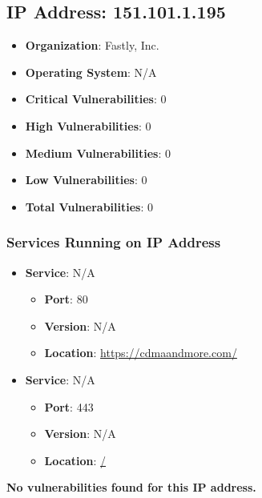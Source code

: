 \documentclass{article}
\begin{document}
\clearpage



\subsection{IP Address: 151.101.1.195}

\begin{itemize}
    \item \textbf{Organization}: Fastly, Inc.
    \item \textbf{Operating System}:  N/A 
    \item \textbf{Critical Vulnerabilities}: 0
    \item \textbf{High Vulnerabilities}: 0
    \item \textbf{Medium Vulnerabilities}: 0
    \item \textbf{Low Vulnerabilities}: 0
    \item \textbf{Total Vulnerabilities}: 0
\end{itemize}

\subsubsection*{Services Running on IP Address}

\begin{itemize}
    
        \item \textbf{Service}: N/A
        \begin{itemize}
            \item \textbf{Port}: 80
            \item \textbf{Version}:  N/A 
            \item \textbf{Location}: \href{ https://cdmaandmore.com/ }{ https://cdmaandmore.com/ }
        \end{itemize}
    
        \item \textbf{Service}: N/A
        \begin{itemize}
            \item \textbf{Port}: 443
            \item \textbf{Version}:  N/A 
            \item \textbf{Location}: \href{ / }{ / }
        \end{itemize}
    
\end{itemize}


\textbf{No vulnerabilities found for this IP address.}
\end{document}
